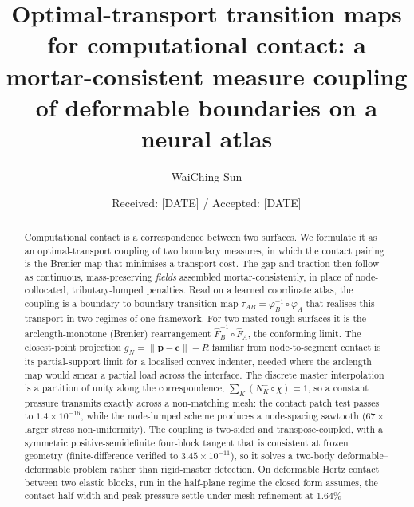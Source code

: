 \documentclass{svjour3}                 %
\newcommand{\norm}[1]{\lVert#1\rVert}
\newcommand{\gn}{g_{\scriptscriptstyle N}}
\newcommand{\tmap}{\tau_{AB}}
\newcommand{\map}[1]{\varphi_{#1}}
\begin{document}
\title{Optimal-transport transition maps for computational contact:
a mortar-consistent measure coupling of deformable boundaries on a neural atlas}

\author{WaiChing Sun}

\date{Received: [DATE] / Accepted: [DATE]}

\maketitle

\begin{abstract}
Computational contact is a correspondence between two surfaces. We formulate it as an
optimal-transport coupling of two boundary measures, in which the contact pairing is the Brenier map that
minimises a transport cost. The gap and traction then follow as continuous, mass-preserving \emph{fields} assembled
mortar-consistently, in place of node-collocated, tributary-lumped penalties. Read on a learned coordinate atlas,
the coupling is a boundary-to-boundary transition map $\tmap=\map{B}^{-1}\circ\map{A}$ that realises this transport in
two regimes of one framework. For two mated rough surfaces it is the arclength-monotone (Brenier) rearrangement
$\hat F_B^{-1}\circ\hat F_A$, the conforming limit. The closest-point projection $\gn=\norm{\bm p-\bm c}-R$ familiar
from node-to-segment contact is its partial-support limit for a localised convex indenter, needed where the
arclength map would smear a partial load across the interface. The discrete master interpolation is a partition of
unity along the correspondence, $\sum_K(N_K^-\!\circ\chi)=1$, so a constant pressure transmits exactly across a
non-matching mesh: the contact patch test passes to $1.4\times10^{-16}$, while the node-lumped scheme produces a
node-spacing sawtooth ($67\times$ larger stress non-uniformity). The coupling is two-sided and
transpose-coupled, with a symmetric positive-semidefinite four-block tangent that is consistent at frozen geometry
(finite-difference verified to $3.45\times10^{-11}$), so it solves a two-body deformable--deformable problem
rather than rigid-master detection. On deformable Hertz contact between two elastic blocks, run in the half-plane
regime the closed form assumes, the contact half-width and peak pressure settle under mesh refinement at $1.64\%$

\end{abstract}
\end{document}
